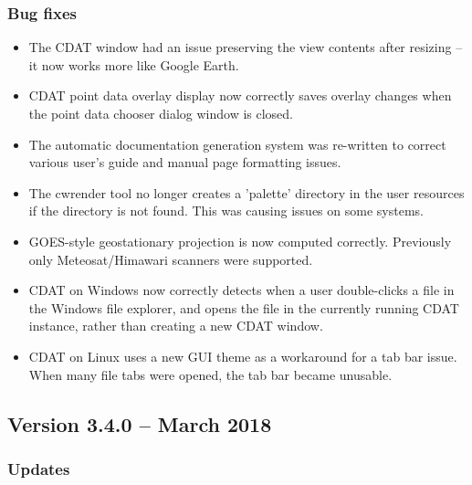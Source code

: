 \subsubsection*{ Bug fixes}
\begin{itemize}

  \item The CDAT window had an issue preserving the view contents after
  resizing -- it now works more like Google Earth.

  \item CDAT point data overlay display now correctly saves overlay changes
  when the point data chooser dialog window is closed.

  \item The automatic documentation generation system was re-written to
  correct various user's guide and manual page formatting issues.

  \item The cwrender tool no longer creates a 'palette' directory in the
  user resources if the directory is not found.  This was causing issues
  on some systems.

  \item GOES-style geostationary projection is now computed correctly.
  Previously only Meteosat/Himawari scanners were supported.

  \item CDAT on Windows now correctly detects when a user double-clicks
  a file in the Windows file explorer, and opens the file in the currently
  running CDAT instance, rather than creating a new CDAT window.

  \item CDAT on Linux uses a new GUI theme as a workaround for a tab bar
  issue.  When many file tabs were opened, the tab bar became unusable.

\end{itemize}


\subsection*{Version 3.4.0 -- March 2018}

\subsubsection*{ Updates}


